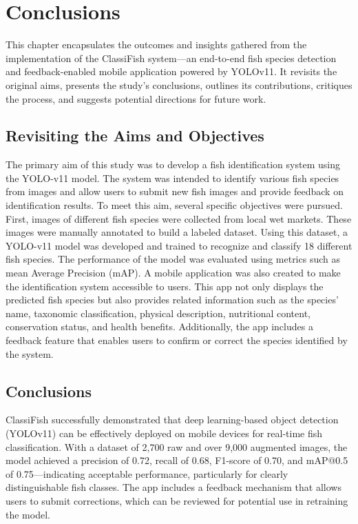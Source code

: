 \chapter{Conclusions}
This chapter encapsulates the outcomes and insights gathered from the implementation of the ClassiFish system—an end-to-end fish species detection and feedback-enabled mobile application powered by YOLOv11. It revisits the original aims, presents the study's conclusions, outlines its contributions, critiques the process, and suggests potential directions for future work.

\section{Revisiting the Aims and Objectives}
The primary aim of this study was to develop a fish identification system using the YOLO-v11 model. The system was intended to identify various fish species from images and allow users to submit new fish images and provide feedback on identification results. To meet this aim, several specific objectives were pursued. First, images of different fish species were collected from local wet markets. These images were manually annotated to build a labeled dataset. Using this dataset, a YOLO-v11 model was developed and trained to recognize and classify 18 different fish species. The performance of the model was evaluated using metrics such as mean Average Precision (mAP). A mobile application was also created to make the identification system accessible to users. This app not only displays the predicted fish species but also provides related information such as the species’ name, taxonomic classification, physical description, nutritional content, conservation status, and health benefits. Additionally, the app includes a feedback feature that enables users to confirm or correct the species identified by the system.

\section{Conclusions}
ClassiFish successfully demonstrated that deep learning-based object detection (YOLOv11) can be effectively deployed on mobile devices for real-time fish classification. With a dataset of 2,700 raw and over 9,000 augmented images, the model achieved a precision of 0.72, recall of 0.68, F1-score of 0.70, and mAP@0.5 of 0.75—indicating acceptable performance, particularly for clearly distinguishable fish classes. The app includes a feedback mechanism that allows users to submit corrections, which can be reviewed for potential use in retraining the model.

